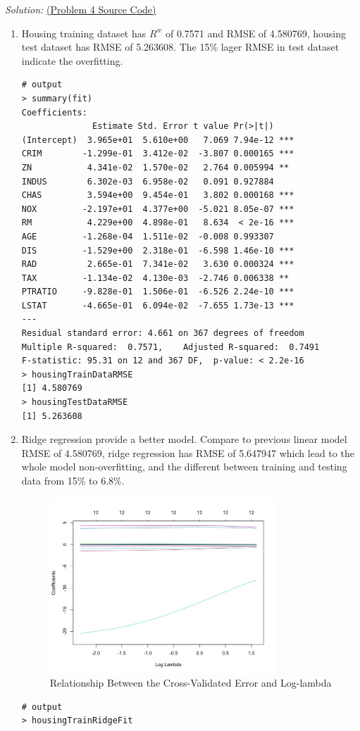 \documentclass{article}
\newenvironment{solution}
    {\textit{Solution:}}
    {}
\begin{document}
\begin{solution}
\href{run:./src/p4.r}{ (Problem 4 Source Code)}
\begin{enumerate}
	\item \mbox{}
	Housing training dataset has $R^w$ of 0.7571 and RMSE of 4.580769, housing test dataset has RMSE of 5.263608. The 15\% lager RMSE in test dataset indicate the overfitting.
	\begin{lstlisting}
# output
> summary(fit)
Coefficients:
              Estimate Std. Error t value Pr(>|t|)    
(Intercept)  3.965e+01  5.610e+00   7.069 7.94e-12 ***
CRIM        -1.299e-01  3.412e-02  -3.807 0.000165 ***
ZN           4.341e-02  1.570e-02   2.764 0.005994 ** 
INDUS        6.302e-03  6.958e-02   0.091 0.927884    
CHAS         3.594e+00  9.454e-01   3.802 0.000168 ***
NOX         -2.197e+01  4.377e+00  -5.021 8.05e-07 ***
RM           4.229e+00  4.898e-01   8.634  < 2e-16 ***
AGE         -1.268e-04  1.511e-02  -0.008 0.993307    
DIS         -1.529e+00  2.318e-01  -6.598 1.46e-10 ***
RAD          2.665e-01  7.341e-02   3.630 0.000324 ***
TAX         -1.134e-02  4.130e-03  -2.746 0.006338 ** 
PTRATIO     -9.828e-01  1.506e-01  -6.526 2.24e-10 ***
LSTAT       -4.665e-01  6.094e-02  -7.655 1.73e-13 ***
---
Residual standard error: 4.661 on 367 degrees of freedom
Multiple R-squared:  0.7571,	Adjusted R-squared:  0.7491 
F-statistic: 95.31 on 12 and 367 DF,  p-value: < 2.2e-16
> housingTrainDataRMSE
[1] 4.580769
> housingTestDataRMSE                                              
[1] 5.263608
	\end{lstlisting}
	\item \mbox{}
	Ridge regression provide a better model. Compare to previous linear model RMSE of 4.580769, ridge regression has RMSE of 5.647947 which lead to the whole model non-overfitting, and the different between training and testing data from 15\% to 6.8\%.
	\begin{figure}[h]
		\centering
		\includegraphics[width=0.8\textwidth]{figure3_Rplot.jpeg}
		\caption{Relationship Between the Cross-Validated Error and Log-lambda}
	\end{figure}	
	\begin{lstlisting}
# output
> housingTrainRidgeFit


\end{lstlisting}
\end{enumerate}
\end{solution}
\end{document}
